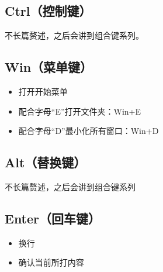 \subsection{Ctrl（控制键）}
不长篇赘述，之后会讲到组合键系列。
\subsection{Win（菜单键）}
\begin{itemize}
	\item 打开开始菜单
	\item 配合字母“E”打开文件夹：Win+E
	\item 配合字母“D”最小化所有窗口：Win+D
\end{itemize}
\subsection{Alt（替换键）}
不长篇赘述，之后会讲到组合键系列
\subsection{Enter（回车键）}
\begin{itemize}
	\item 换行
	\item 确认当前所打内容
\end{itemize}